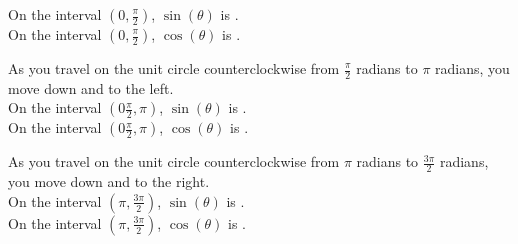 \documentclass{ximera}
\begin{document}
\begin{example}
\begin{question}
On the interval $\left (0, \frac{\pi}{2} \right)$, $\sin(\theta)$ is . \\


On the interval $\left (0, \frac{\pi}{2} \right)$, $\cos(\theta)$ is . \\

\end{question}







\begin{question}


As you travel on the unit circle counterclockwise from $\frac{\pi}{2}$ radians to $\pi$ radians, you move down and to the left. \\


On the interval $\left (0\frac{\pi}{2}, \pi \right)$, $\sin(\theta)$ is . \\

On the interval $\left (0\frac{\pi}{2}, \pi \right)$, $\cos(\theta)$ is . \\

\end{question}







\begin{question}


As you travel on the unit circle counterclockwise from $\pi$ radians to $\frac{3\pi}{2}$ radians, you move down and to the right. \\


On the interval $\left (\pi, \frac{3\pi}{2} \right)$, $\sin(\theta)$ is . \\


On the interval $\left (\pi, \frac{3\pi}{2} \right)$, $\cos(\theta)$ is . \\


\end{question}








\begin{question}



\end{question}
\end{example}
\end{document}
